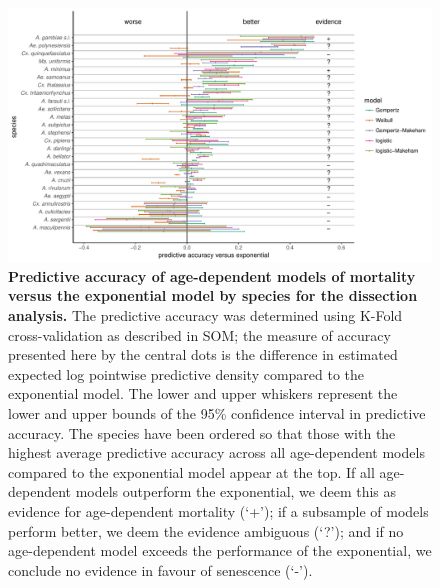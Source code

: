 \documentclass[12pt]{article}
\begin{document}
\begin{figure}[h]
	\centerline{\includegraphics[width=1.3\textwidth]{./Figure_files/dissection_elpd_vs_exponential_ordered.pdf}}
	\caption{\textbf{Predictive accuracy of age-dependent models of mortality versus the exponential model by species for the dissection analysis.} The predictive accuracy was determined using K-Fold cross-validation as described in SOM; the measure of accuracy presented here by the central dots is the difference in estimated expected log pointwise predictive density compared to the exponential model. The lower and upper whiskers represent the lower and upper bounds of the 95\% confidence interval in predictive accuracy. The species have been ordered so that those with the highest average predictive accuracy across all age-dependent models compared to the exponential model appear at the top. If all age-dependent models outperform the exponential, we deem this as evidence for age-dependent mortality (`+'); if a subsample of models perform better, we deem the evidence ambiguous (`?'); and if no age-dependent model exceeds the performance of the exponential, we conclude no evidence in favour of senescence (`-').}
	\label{fig:dissection_elpd}
\end{figure}
\end{document}
